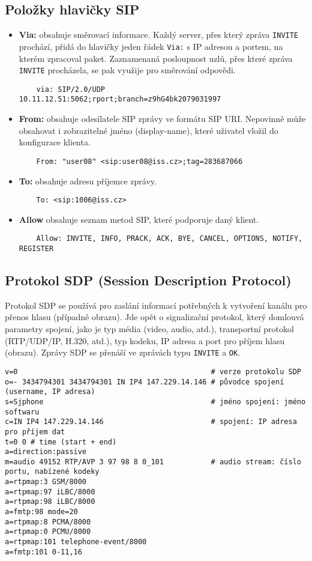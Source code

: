 \subsection{Položky hlavičky SIP}
\begin{itemize}
    \item {\bf Via:} obsahuje směrovací informace. Každý server, přes který zpráva {\tt INVITE} prochází,
      přidá do hlavičky jeden řádek {\tt Via:} s IP adresou a portem, na kterém zpracoval paket. Zaznamenaná posloupnost uzlů, přes které zpráva {\tt INVITE} procházela, se pak využije pro směrování odpovědi. 
    \begin{verbatim}
    via: SIP/2.0/UDP 10.11.12.51:5062;rport;branch=z9hG4bk2079031997
    \end{verbatim}
    \item {\bf From:} obsahuje odesílatele SIP zprávy ve formátu SIP URI. Nepovinně může obsahovat i zobrazitelné jméno (display-name), které uživatel vložil do konfigurace klienta. 
    \begin{verbatim}
    From: "user08" <sip:user08@iss.cz>;tag=283687066
    \end{verbatim}
  \item {\bf To:} obsahuje adresu příjemce zprávy. 
    \begin{verbatim}
    To: <sip:1006@iss.cz>
    \end{verbatim}
    \item {\bf Allow} obsahuje seznam metod SIP, které podporuje daný klient.
    \begin{verbatim}
    Allow: INVITE, INFO, PRACK, ACK, BYE, CANCEL, OPTIONS, NOTIFY, REGISTER
    \end{verbatim}
\end{itemize}

\subsection{Protokol SDP (Session Description Protocol)}
Protokol SDP \cite{rfc4566} se používá pro zaslání informací potřebných k vytvoření kanálu pro přenos hlasu (případně obrazu). Jde opět o signalizační protokol, který domlouvá parametry spojení, jako je typ média (video, audio, atd.), transportní protokol (RTP/UDP/IP, H.320, atd.), typ kodeku, IP adresa a port pro příjem hlasu (obrazu).
Zprávy SDP se přenáší ve zprávách typu {\tt INVITE} a {\tt OK}.
{\footnotesize
\begin{verbatim}
v=0                                             # verze protokolu SDP
o=- 3434794301 3434794301 IN IP4 147.229.14.146 # původce spojení (username, IP adresa)
s=Sjphone                                       # jméno spojení: jméno softwaru
c=IN IP4 147.229.14.146                         # spojení: IP adresa pro příjem dat
t=0 0 # time (start + end)
a=direction:passive                               
m=audio 49152 RTP/AVP 3 97 98 8 0_101           # audio stream: číslo portu, nabízené kodeky
a=rtpmap:3 GSM/8000
a=rtpmap:97 iLBC/8000
a=rtpmap:98 iLBC/8000
a=fmtp:98 mode=20
a=rtpmap:8 PCMA/8000
a=rtpmap:0 PCMU/8000
a=rtpmap:101 telephone-event/8000
a=fmtp:101 0-11,16
\end{verbatim} 
}
